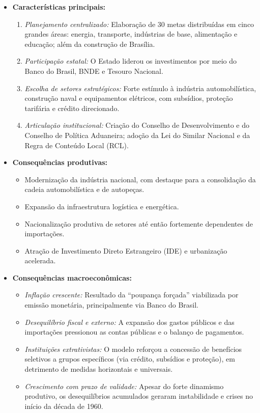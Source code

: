\documentclass{sciposter}
\begin{document}
\begin{multicols}{3}
\begin{itemize}
    \item \textbf{Características principais:}
    \begin{enumerate}
        \item \textit{Planejamento centralizado:} Elaboração de 30 metas distribuídas em cinco grandes áreas: energia, transporte, indústrias de base, alimentação e educação; além da construção de Brasília.
        \item \textit{Participação estatal:} O Estado liderou os investimentos por meio do Banco do Brasil, BNDE e Tesouro Nacional.
        \item \textit{Escolha de setores estratégicos:} Forte estímulo à indústria automobilística, construção naval e equipamentos elétricos, com subsídios, proteção tarifária e crédito direcionado.
        \item \textit{Articulação institucional:} Criação do Conselho de Desenvolvimento e do Conselho de Política Aduaneira; adoção da Lei do Similar Nacional e da Regra de Conteúdo Local (RCL).
    \end{enumerate}

    \item \textbf{Consequências produtivas:}
    \begin{itemize}
        \item Modernização da indústria nacional, com destaque para a consolidação da cadeia automobilística e de autopeças.
        \item Expansão da infraestrutura logística e energética.
        \item Nacionalização produtiva de setores até então fortemente dependentes de importações.
        \item Atração de Investimento Direto Estrangeiro (IDE) e urbanização acelerada.
    \end{itemize}

    \item \textbf{Consequências macroeconômicas:}
    \begin{itemize}
        \item \textit{Inflação crescente:} Resultado da “poupança forçada” viabilizada por emissão monetária, principalmente via Banco do Brasil.
        \item \textit{Desequilíbrio fiscal e externo:} A expansão dos gastos públicos e das importações pressionou as contas públicas e o balanço de pagamentos.
        \item \textit{Instituições extrativistas:} O modelo reforçou a concessão de benefícios seletivos a grupos específicos (via crédito, subsídios e proteção), em detrimento de medidas horizontais e universais.
        \item \textit{Crescimento com prazo de validade:} Apesar do forte dinamismo produtivo, os desequilíbrios acumulados geraram instabilidade e crises no início da década de 1960.
    \end{itemize}
\end{itemize}


\end{multicols}
\end{document}
